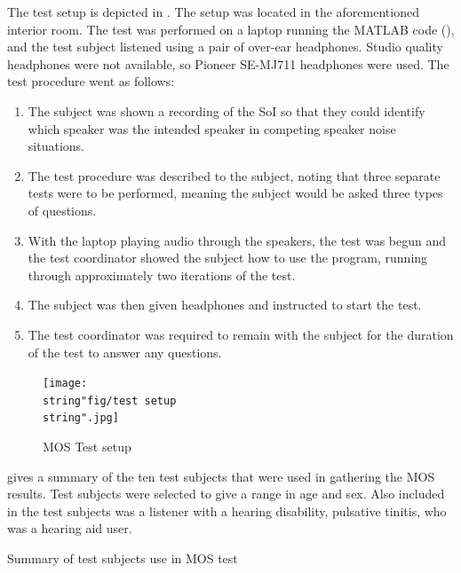 The test setup is depicted in . The setup
was located in the aforementioned interior room. The test was performed
on a laptop running the MATLAB code (), and the
test subject listened using a pair of over-ear headphones. Studio
quality headphones were not available, so Pioneer SE-MJ711 headphones
were used. The test procedure went as follows:
\begin{enumerate}
\item The subject was shown a recording of the \ac{SoI} so that they could
identify which speaker was the intended speaker in competing speaker
noise situations.
\item The test procedure was described to the subject, noting that three
separate tests were to be performed, meaning the subject would be
asked three types of questions.
\item With the laptop playing audio through the speakers, the test was begun
and the test coordinator showed the subject how to use the program,
running through approximately two iterations of the test.
\item The subject was then given headphones and instructed to start the
test.
\item The test coordinator was required to remain with the subject for the
duration of the test to answer any questions.
\end{enumerate}
\begin{figure}
\begin{centering}
\texttt{[image: \\string"fig/test setup\\string".jpg]}
\par\end{centering}

\protect\caption{\label{fig:MOS-Test-setup}MOS Test setup}
\end{figure}


 gives a summary of the ten test subjects
that were used in gathering the \ac{MOS} results. Test subjects were
selected to give a range in age and sex. Also included in the test
subjects was a listener with a hearing disability, pulsative tinitis,
who was a hearing aid user.

\begin{table}
\protect\caption{\label{tab:MOS-Subject-summary}Summary of test subjects use in \ac{MOS}
test}


\centering{}
\end{table}



